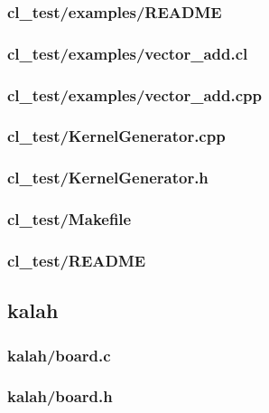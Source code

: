 \documentclass{article}
\begin{document}
\subsubsection*{cl\_test/examples/README}


\subsubsection*{cl\_test/examples/vector\_add.cl}


\subsubsection*{cl\_test/examples/vector\_add.cpp}


\subsubsection*{cl\_test/KernelGenerator.cpp}


\subsubsection*{cl\_test/KernelGenerator.h}


\subsubsection*{cl\_test/Makefile}


\subsubsection*{cl\_test/README}


\subsection{kalah}
\subsubsection*{kalah/board.c}


\subsubsection*{kalah/board.h}

\end{document}
